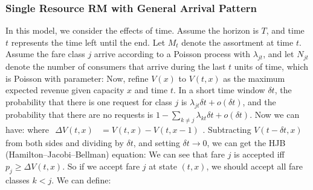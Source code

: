 \documentclass[10pt]{report}
\begin{document}
\subsubsection{Single Resource RM with General Arrival Pattern}
In this model, we consider the effects of time. Assume the horizon is $T$, and time $t$ represents the time left until the end.
Let $M_t$ denote the assortment at time $t$. Assume the fare class $j$ arrive according to a Poisson process with $\lambda_{jt}$, and let $N_{jt}$ denote
the number of consumers that arrive during the last $t$ units of time, which is Poisson with parameter:
Now, refine $V(x)$ to $V(t, x)$ as the maximum expected revenue given capacity $x$ and time $t$. In a short time window $\delta t$, the probability that there is one request for class $j$ is $\lambda_{jt}\delta t+o(\delta t)$,
and the probability that there are no requests is $1-\sum_{k\neq j}\lambda_{kt}\delta t+o(\delta t)$. Now we can have:
where $\begin{aligned}\Delta V(t,x)&=V(t,x)-V(t,x-1)\end{aligned}$. Subtracting $V(t-\delta t,x)$ from both sides and dividing by $\delta t$, and setting $\delta t\to 0$, we can get the HJB (Hamilton–Jacobi–Bellman) equation:
We can see that fare $j$ is accepted iff $p_j\geq\Delta V(t,x)$. So if we accept fare $j$ at state $(t, x)$, we should accept all fare classes $k<j$. We can define:
\end{document}
